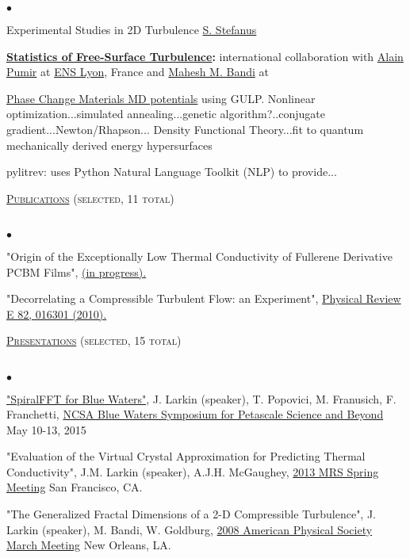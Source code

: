 \documentclass{article}
\newcommand{\lineunder}{\vspace*{-8pt} \\ \hspace*{-18pt} \hrulefill \\}
\newcommand{\header}[1]{{\hspace*{-15pt}\vspace*{6pt} \textsc{#1}} \vspace*{-6pt} \lineunder}
\newenvironment{achievements}{\begin{list}{$\bullet$}{\topsep 0pt \itemsep -2pt}}{\vspace*{4pt}\end{list}}
\begin{document}
\begin{achievements}
\item Experimental Studies in 2D Turbulence
\href{http://www.physicsandastronomy.pitt.edu/news-story/phd-defense-stefanus}{S. Stefanus}

\item \textbf{\href{http://jasonlarkin.github.io/projects-ms.html}{Statistics of Free-Surface Turbulence}:} international collaboration with \href{http://perso.ens-lyon.fr/alain.pumir/Pumir_webpage.html}{Alain Pumir} at \href{http://www.ens-lyon.eu/annuaire/m-pumir-alain-83656.kjsp?RH=ZYZYZYZYZYZYZYZYZYZYZY}{ENS Lyon}, France and \href{https://groups.oist.jp/ciu/mahesh-m-bandi}{Mahesh M. Bandi} at 

\item \href{https://github.com/jasonlarkin/pcm-potentials}{Phase Change Materials MD potentials} using GULP. Nonlinear optimization...simulated annealing...genetic algorithm?..conjugate gradient...Newton/Rhapson... Density Functional Theory...fit to quantum mechanically derived energy hypersurfaces

\item pylitrev: uses Python Natural Language Toolkit (NLP) to provide...

\end{achievements}

\header{\href{http://jasonlarkin.github.io/pub.html}{Publications} (selected, 11 total)}
\begin{achievements}
\item "Origin of the Exceptionally Low Thermal Conductivity of Fullerene Derivative  PCBM Films", 
\href{http://jasonlarkin.github.io/projects-phd-pcbm.html}{(in progress).}
\item "Decorrelating a Compressible Turbulent Flow: an Experiment", \href{http://pre.aps.org/abstract/PRE/v82/i1/e016301}{Physical Review E 82, 016301 (2010).}
\end{achievements}

\header{\href{http://jasonlarkin.org/pres.html}{Presentations} (selected, 15 total)}
\begin{achievements}
\item \href{https://bluewaters.ncsa.illinois.edu/documents/10157/5a0a0d37-95bf-460b-a7f0-cfadd15abec8}{"SpiralFFT for Blue Waters"}, J. Larkin (speaker), T. Popovici, M. Franusich, F. Franchetti, \href{https://bluewaters.ncsa.illinois.edu/paid-ime#SPIRAL FFT}{NCSA Blue Waters Symposium for Petascale Science and Beyond} May 10-13, 2015
\item "Evaluation of the Virtual Crystal Approximation for Predicting Thermal Conductivity", J.M. Larkin (speaker), A.J.H.
   McGaughey, \href{http://www.mrs.org/spring2013/}{2013 MRS Spring Meeting} San Francisco, CA.
\item "The Generalized Fractal Dimensions of a 2-D Compressible Turbulence", J. Larkin (speaker), M. Bandi, W. Goldburg, \href{http://meetings.aps.org/Meeting/MAR08/Content/1017}{2008 American Physical Society March Meeting} New Orleans, LA.


\end{achievements}
\end{document}
